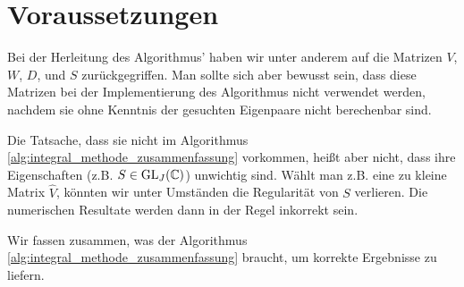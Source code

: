 \section{Voraussetzungen}

Bei der Herleitung des Algorithmus' haben wir unter anderem auf die Matrizen $V$, $W$, $D$, und $S$ zurückgegriffen.
Man sollte sich aber bewusst sein, dass diese Matrizen bei der Implementierung des Algorithmus nicht verwendet werden, nachdem sie ohne Kenntnis der gesuchten Eigenpaare nicht berechenbar sind.

Die Tatsache, dass sie nicht im Algorithmus \ref{alg:integral_methode_zusammenfassung} vorkommen, heißt aber nicht, dass ihre Eigenschaften (z.B. $S \in \operatorname{GL}_J(\mathbb{C})$) unwichtig sind.
Wählt man z.B. eine zu kleine Matrix $\hat V$, könnten wir unter Umständen die Regularität von $S$ verlieren.
Die numerischen Resultate werden dann in der Regel inkorrekt sein.

Wir fassen zusammen, was der Algorithmus \ref{alg:integral_methode_zusammenfassung} braucht, um korrekte Ergebnisse zu liefern.

